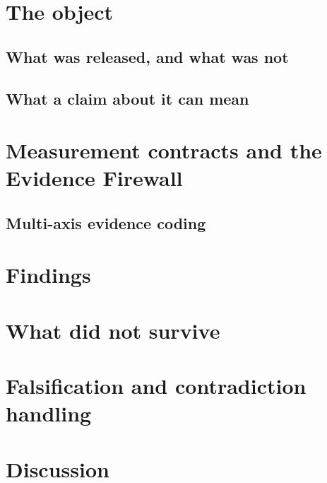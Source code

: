 \section{The object}
\subsection{What was released, and what was not}
\subsection{What a claim about it can mean}

\section{Measurement contracts and the Evidence Firewall}

\subsection{Multi-axis evidence coding}

\section{Findings}

\section{What did not survive}

\section{Falsification and contradiction handling}

\section{Discussion}
